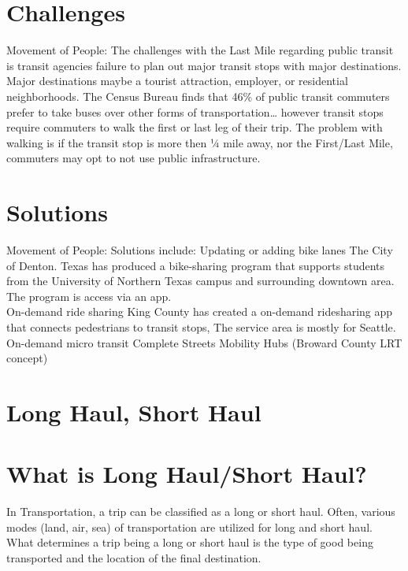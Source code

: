\documentclass[
]{book}
\begin{document}
\hypertarget{SupplyChain-whatisFirstchallenges}{%
\section{Challenges}\label{SupplyChain-whatisFirstchallenges}}

Movement of People:
The challenges with the Last Mile regarding public transit is transit agencies failure to plan out major transit stops with major destinations.
Major destinations maybe a tourist attraction, employer, or residential neighborhoods.
The Census Bureau finds that 46\% of public transit commuters prefer to take buses over other forms of transportation\ldots{} however transit stops require commuters to walk the first or last leg of their trip.
The problem with walking is if the transit stop is more then ¼ mile away, nor the First/Last Mile, commuters may opt to not use public infrastructure.

\hypertarget{SupplyChain-solution}{%
\section{Solutions}\label{SupplyChain-solution}}

Movement of People:
Solutions include:
Updating or adding bike lanes
The City of Denton. Texas has produced a bike-sharing program that supports students from the University of Northern Texas campus and surrounding downtown area. The program is access via an app.\\
On-demand ride sharing
King County has created a on-demand ridesharing app that connects pedestrians to transit stops, The service area is mostly for Seattle.\\
On-demand micro transit
Complete Streets
Mobility Hubs (Broward County LRT concept)

\hypertarget{SupplyChain-haul}{%
\section{Long Haul, Short Haul}\label{SupplyChain-haul}}

\hypertarget{SupplyChain-whatishaul}{%
\section{What is Long Haul/Short Haul?}\label{SupplyChain-whatishaul}}

In Transportation, a trip can be classified as a long or short haul.
Often, various modes (land, air, sea) of transportation are utilized for long and short haul.
What determines a trip being a long or short haul is the type of good being transported and the location of the final destination.
\end{document}
